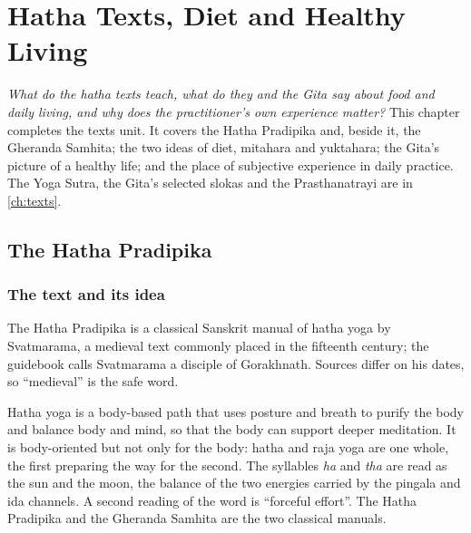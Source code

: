 \chapter{Hatha Texts, Diet and Healthy Living}
\label{ch:hatha-diet-living}

\emph{What do the hatha texts teach, what do they and the Gita say about food and daily living, and why does the practitioner's own experience matter?}
This chapter completes the texts unit. It covers the Hatha Pradipika and, beside it, the Gheranda Samhita; the two ideas of diet, mitahara and yuktahara; the Gita's picture of a healthy life; and the place of subjective experience in daily practice. The Yoga Sutra, the Gita's selected slokas and the Prasthanatrayi are in \cref{ch:texts}.

\section{The Hatha Pradipika}

\subsection*{The text and its idea}
The Hatha Pradipika is a classical Sanskrit manual of hatha yoga by Svatmarama, a medieval text commonly placed in the fifteenth century; the guidebook calls Svatmarama a disciple of Gorakhnath. Sources differ on his dates, so ``medieval'' is the safe word.

Hatha yoga is a body-based path that uses posture and breath to purify the body and balance body and mind, so that the body can support deeper meditation. It is body-oriented but not only for the body: hatha and raja yoga are one whole, the first preparing the way for the second. The syllables \emph{ha} and \emph{tha} are read as the sun and the moon, the balance of the two energies carried by the pingala and ida channels. A second reading of the word is ``forceful effort''. The Hatha Pradipika and the Gheranda Samhita are the two classical manuals.

